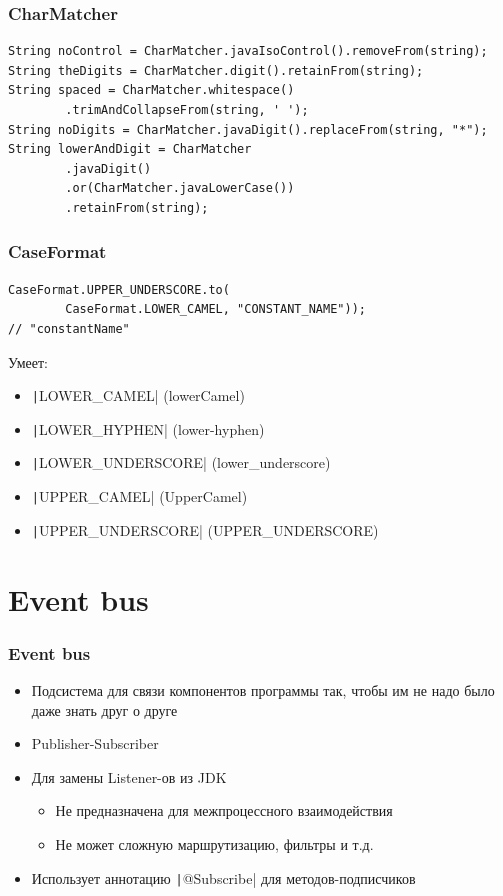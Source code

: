 \documentclass[xetex,mathserif,serif]{beamer}
\begin{document}
	\begin{frame}[fragile]
		\frametitle{CharMatcher}
		\begin{verbatim}
String noControl = CharMatcher.javaIsoControl().removeFrom(string);
String theDigits = CharMatcher.digit().retainFrom(string);
String spaced = CharMatcher.whitespace()
        .trimAndCollapseFrom(string, ' ');
String noDigits = CharMatcher.javaDigit().replaceFrom(string, "*");
String lowerAndDigit = CharMatcher
        .javaDigit()
        .or(CharMatcher.javaLowerCase())
        .retainFrom(string);
		\end{verbatim}
\end{frame}

	\begin{frame}[fragile]
		\frametitle{CaseFormat}
		\begin{verbatim}
CaseFormat.UPPER_UNDERSCORE.to(
        CaseFormat.LOWER_CAMEL, "CONSTANT_NAME")); 
// "constantName"
		\end{verbatim}
		Умеет: 
		\begin{itemize}
			\item \texttt|LOWER_CAMEL| (lowerCamel)
			\item \texttt|LOWER_HYPHEN| (lower-hyphen)
			\item \texttt|LOWER_UNDERSCORE| (lower\_underscore)
			\item \texttt|UPPER_CAMEL| (UpperCamel)
			\item \texttt|UPPER_UNDERSCORE| (UPPER\_UNDERSCORE)
		\end{itemize}
\end{frame}

	\section{Event bus}

	\begin{frame}
		\frametitle{Event bus}
		\begin{itemize}
			\item Подсистема для связи компонентов программы так, чтобы им не надо было даже знать друг о друге
			\item Publisher-Subscriber
			\item Для замены Listener-ов из JDK
			\begin{itemize}
				\item Не предназначена для межпроцессного взаимодействия
				\item Не может сложную маршрутизацию, фильтры и т.д.
			\end{itemize}
			\item Использует аннотацию \texttt|@Subscribe| для методов-подписчиков
		\end{itemize}
	\end{frame}
\end{document}
